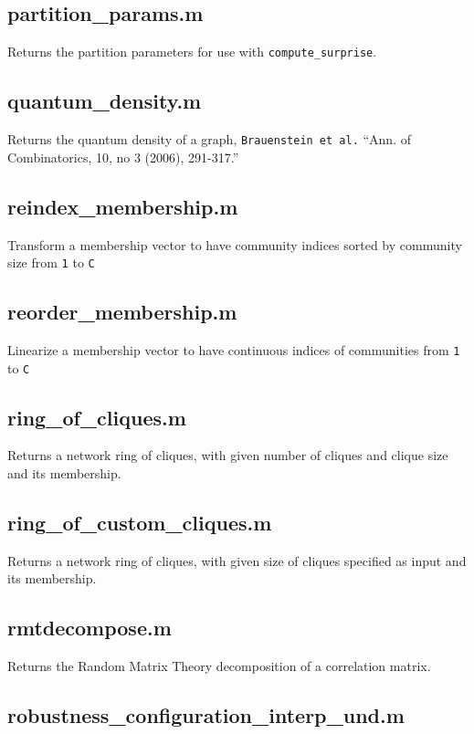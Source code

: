 \documentclass[a4paper]{report}
\begin{document}
  \subsection*{partition\_params.m} Returns the partition parameters for use
  with \texttt{compute\_surprise}.

  \subsection*{quantum\_density.m} Returns the quantum density of a graph,
  \texttt{Brauenstein\ et\ al.} ``Ann. of Combinatorics, 10, no 3
  (2006), 291-317.''

  \subsection*{reindex\_membership.m} Transform a membership vector to have
  community indices sorted by community size from \texttt{1} to
  \texttt{\textbar{}C\textbar{}}

  \subsection*{reorder\_membership.m} Linearize a membership vector to have
  continuous indices of communities from \texttt{1} to
  \texttt{\textbar{}C\textbar{}}

  \subsection*{ring\_of\_cliques.m} Returns a network ring of cliques, with
  given number of cliques and clique size and its membership.

  \subsection*{ring\_of\_custom\_cliques.m} Returns a network ring of
  cliques, with given size of cliques specified as input and its
  membership.

  \subsection*{rmtdecompose.m} Returns the Random Matrix Theory decomposition
  of a correlation matrix.

  \subsection*{robustness\_configuration\_interp\_und.m}
\end{document}
